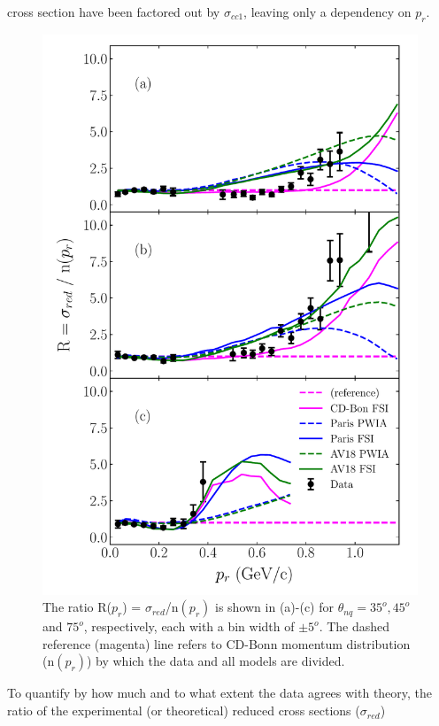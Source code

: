 cross section have been factored out by $\sigma_{cc1}$, leaving only a dependency on $p_{r}$. \\
\begin{figure}
\includegraphics[scale=0.5]{../prl_plots/PRL_plot2.pdf}
\caption{The ratio R($p_{r}$) = $\sigma_{red}$/n$(p_{r})$ is shown in (a)-(c) for $\theta_{nq}=35^{o}, 45^{o}$ and $75^{o}$, respectively, each with a bin width of $\pm 5^{o}$.
                              The dashed reference (magenta) line refers to CD-Bonn momentum distribution (n$(p_{r})$) by which the data and all models are divided. }
\label{fig:fig1}
\end{figure}
\indent To quantify by how much and to what extent the data agrees with theory, the ratio of the experimental (or theoretical) reduced cross sections ($\sigma_{red}$)
